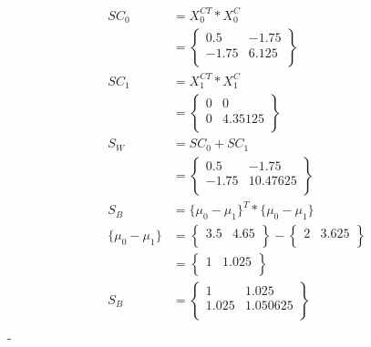 \documentclass[12pt,english]{article}
\begin{document}
\begin{equation}
\begin{split}
SC_0 &= X_{0}^{CT} * X_{0}^{C}\\
&= 
\begin{Bmatrix}
0.5 & -1.75 \\
-1.75 & 6.125 \\
\end{Bmatrix}\\
SC_1 &= X_{1}^{CT} * X_{1}^{C}\\
&= 
\begin{Bmatrix}
0 & 0 \\
0 & 4.35125 \\
\end{Bmatrix}\\
S_W &= SC_0 + SC_1\\
&= 
\begin{Bmatrix}
0.5 & -1.75 \\
-1.75 & 10.47625 \\
\end{Bmatrix}\\
S_B &= \{ \mu_0 - \mu_1\}^{T} * \{ \mu_0 - \mu_1\}\\
\{ \mu_0 - \mu_1\} &= 
\begin{Bmatrix}
3.5 & 4.65 \\
\end{Bmatrix}
 -
\begin{Bmatrix}
2 & 3.625 \\
\end{Bmatrix}\\
&= 
\begin{Bmatrix}
1 & 1.025 \\
\end{Bmatrix}\\
S_B &=
\begin{Bmatrix}
1        & 1.025 \\
1.025 & 1.050625 \\
\end{Bmatrix}\\
\end{split} 
\end{equation}
-
\end{document}
